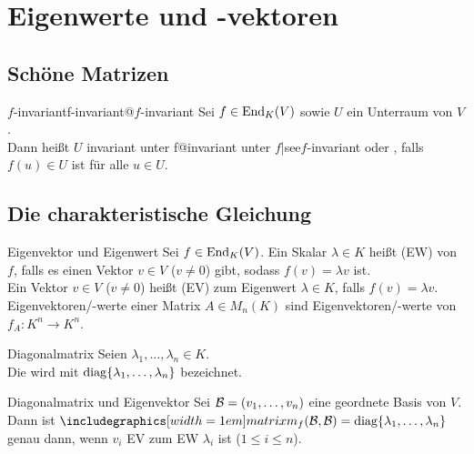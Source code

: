 \section{%
    Eigenwerte und -vektoren%
}

\subsection{%
    Schöne Matrizen%
}

\begin{xDef}{$f$-invariant}{f-invariant@$f$-invariant}
    Sei $f \in \operatorname{End}_K(V)$ sowie $U$ ein Unterraum von $V$. \\
    Dann heißt $U$
    {invariant unter f@invariant unter $f$|see{$f$-invariant}} oder
    ,
    falls $f(u) \in U$ ist für alle $u \in U$.
\end{xDef}

\subsection{%
    Die charakteristische Gleichung%
}

\begin{Def}{Eigenvektor und Eigenwert}
    Sei $f \in \operatorname{End}_K(V)$.
    Ein Skalar $\lambda \in K$ heißt  (EW) von $f$, falls
    es einen Vektor $v \in V$ ($v \not= 0$) gibt, sodass $f(v) = \lambda v$
    ist. \\
    Ein Vektor $v \in V$ ($v \not= 0$) heißt  (EV) zum
    Eigenwert $\lambda \in K$, falls $f(v) = \lambda v$. \\
    Eigenvektoren/-werte einer Matrix $A \in M_n(K)$ sind Eigenvektoren/-werte
    von $f_A: K^n \rightarrow K^n$.
\end{Def}

\begin{Def}{Diagonalmatrix}
    Seien $\lambda_1, \ldots, \lambda_n \in K$. \\
    Die 
    wird mit $\operatorname{diag}\{\lambda_1, \ldots, \lambda_n\}$ bezeichnet.
\end{Def}

\begin{Lemma}{Diagonalmatrix und Eigenvektor}
    Sei $\mathcal{B} = (v_1, \ldots, v_n)$ eine geordnete Basis von $V$.
    Dann ist $\hommatrix{f}{B}{B} = \diag\{\lambda_1, \ldots, \lambda_n\}$
    genau dann, wenn $v_i$ EV zum EW $\lambda_i$ ist ($1 \le i \le n$).
\end{Lemma}

